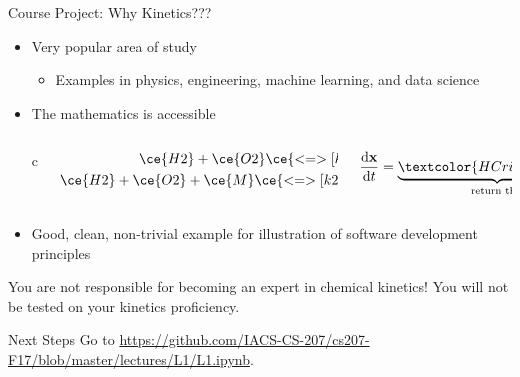 \documentclass[onlymath, nologo]{beamer}
\begin{document}
  \begin{frame}{Course Project:  Why Kinetics???}
    \begin{itemize}
      \item Very popular area of study \\[0.25em]
        \begin{itemize}
          \item Examples in physics, engineering, machine learning, and data science \\[1.0em]
        \end{itemize}
      \item The mathematics is accessible
      \begin{columns}{c}
        \begin{column}{0.5\textwidth}
          \begin{align*}
            \ce{H2} + \ce{O2} \ce{<=>[k1]} \ce{H2O} + \ce{O} \\
            \ce{H2} + \ce{O2} + \ce{M} \ce{<=>[k2]} \ce{H2O2} + \ce{M} 
          \end{align*}
        \end{column}
        \begin{column}{0.5\textwidth}
          \begin{align*}
            \frac{\mathrm{d}\mathbf{x}}{\mathrm{d}t} = 
              \underbrace{\textcolor{HCrimson}{\mathbf{f}\left(\mathbf{x}\right)}}_{\textrm{return this}}
          \end{align*}
        \end{column}
      \end{columns}
      \item Good, clean, non-trivial example for illustration of software development principles \\[1.0em]
    \end{itemize}
    \begin{tcolorbox}[title=Important Note on Expectations, arc is angular]
        \centering
        You are not responsible for becoming an expert in chemical kinetics!  You will not be tested 
        on your kinetics proficiency.
    \end{tcolorbox}
  \end{frame}

  \begin{frame}{Next Steps}
    Go to \url{https://github.com/IACS-CS-207/cs207-F17/blob/master/lectures/L1/L1.ipynb}.
  \end{frame}
\end{document}
